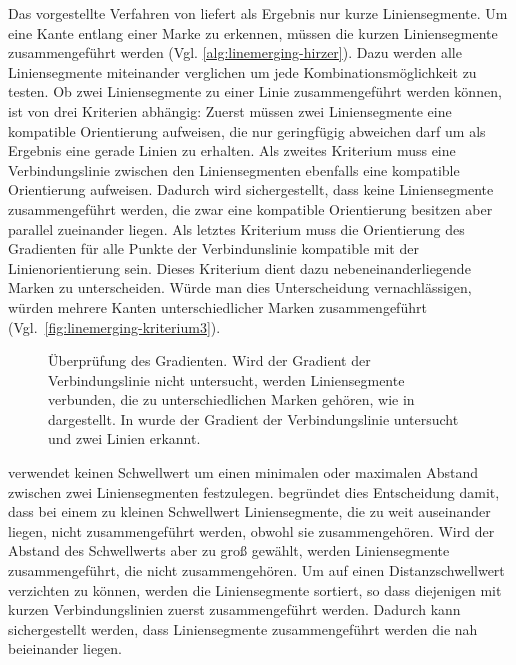 Das vorgestellte Verfahren von \citeauthor{clarke96} liefert als Ergebnis nur kurze Liniensegmente. Um eine Kante
 entlang einer Marke zu erkennen, müssen die kurzen Liniensegmente zusammengeführt werden
 (Vgl. \autoref{alg:linemerging-hirzer}). Dazu werden alle Liniensegmente miteinander verglichen um jede
 Kombinationsmöglichkeit zu testen. Ob zwei Liniensegmente zu einer Linie zusammengeführt werden können, ist von drei
 Kriterien abhängig: Zuerst müssen zwei Liniensegmente eine kompatible Orientierung aufweisen, die nur geringfügig
 abweichen darf um als Ergebnis eine gerade Linien zu erhalten. Als zweites Kriterium muss eine Verbindungslinie
 zwischen den Liniensegmenten ebenfalls eine kompatible Orientierung aufweisen. Dadurch wird sichergestellt, dass keine
 Liniensegmente zusammengeführt werden, die zwar eine kompatible Orientierung besitzen aber parallel zueinander liegen.
 Als letztes Kriterium muss die Orientierung des Gradienten für alle Punkte der Verbindunslinie kompatible mit der
 Linienorientierung sein. Dieses Kriterium dient dazu nebeneinanderliegende Marken zu unterscheiden. Würde man dies
 Unterscheidung vernachlässigen, würden mehrere Kanten unterschiedlicher Marken zusammengeführt
 (Vgl.~\autoref{fig:linemerging-kriterium3}).

\begin{figure}[!ht]
	\centering
	\caption{Überprüfung des Gradienten. Wird der Gradient der Verbindungslinie nicht untersucht, werden Liniensegmente
	 verbunden, die zu unterschiedlichen Marken gehören, wie in  dargestellt. In
	  wurde der Gradient der Verbindungslinie untersucht und zwei Linien erkannt.}
	\label{fig:linemerging-kriterium3}
\end{figure}

\citeauthor{hirzer08} verwendet keinen Schwellwert um einen minimalen oder maximalen Abstand zwischen zwei
 Liniensegmenten festzulegen. \citeauthor{hirzer08} begründet dies Entscheidung damit, dass bei einem zu kleinen
 Schwellwert Liniensegmente, die zu weit auseinander liegen, nicht zusammengeführt werden, obwohl sie zusammengehören.
 Wird der Abstand des Schwellwerts aber zu groß gewählt, werden Liniensegmente zusammengeführt, die nicht
 zusammengehören. Um auf einen Distanzschwellwert verzichten zu können, werden die Liniensegmente sortiert, so dass
 diejenigen mit kurzen Verbindungslinien zuerst zusammengeführt werden. Dadurch kann sichergestellt werden, dass
 Liniensegmente zusammengeführt werden die nah beieinander liegen.


